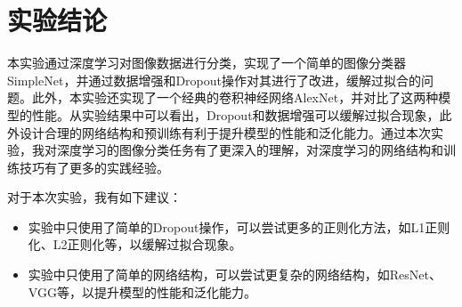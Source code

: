 \section{实验结论}

本实验通过深度学习对图像数据进行分类，实现了一个简单的图像分类器SimpleNet，并通过数据增强和Dropout操作对其进行了改进，缓解过拟合的问题。此外，本实验还实现了一个经典的卷积神经网络AlexNet，并对比了这两种模型的性能。从实验结果中可以看出，Dropout和数据增强可以缓解过拟合现象，此外设计合理的网络结构和预训练有利于提升模型的性能和泛化能力。通过本次实验，我对深度学习的图像分类任务有了更深入的理解，对深度学习的网络结构和训练技巧有了更多的实践经验。

对于本次实验，我有如下建议：

\begin{itemize}
    \item 实验中只使用了简单的Dropout操作，可以尝试更多的正则化方法，如L1正则化、L2正则化等，以缓解过拟合现象。
    \item 实验中只使用了简单的网络结构，可以尝试更复杂的网络结构，如ResNet、VGG等，以提升模型的性能和泛化能力。
\end{itemize}